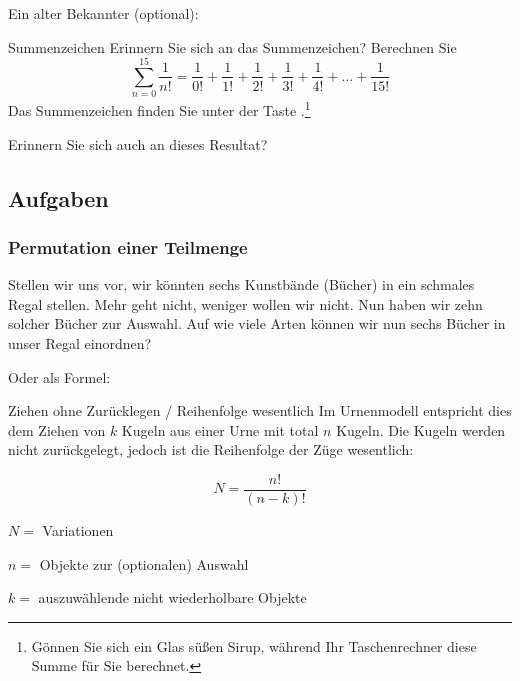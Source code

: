 Ein alter Bekannter (optional):

\vspace{3mm}

\begin{bemerkung}{Summenzeichen}{}
Erinnern Sie sich an das Summenzeichen? Berechnen
Sie $$\sum_{n=0}^{15}\frac{1}{n!} = \frac{1}{0!} + \frac{1}{1!}
+ \frac1{2!} + \frac1{3!} + \frac1{4!} + ... + \frac1{15!}$$ Das Summenzeichen finden Sie unter
der Taste .\footnote{Gönnen Sie sich
ein Glas süßen Sirup, während Ihr Taschenrechner diese Summe für Sie berechnet.}
\end{bemerkung}

Erinnern Sie sich auch an dieses Resultat? 



\subsection*{Aufgaben}
\newpage


\subsubsection{Permutation einer Teilmenge}
Stellen wir uns vor, wir könnten sechs Kunstbände (Bücher) in ein schmales
Regal stellen. Mehr geht nicht, weniger wollen wir nicht.
Nun haben wir zehn solcher Bücher zur Auswahl. Auf wie viele Arten können wir nun sechs Bücher in unser Regal einordnen?


Oder als Formel:
\begin{gesetz}{Ziehen ohne Zurücklegen / Reihenfolge wesentlich}{}
Im Urnenmodell entspricht dies dem Ziehen von $k$ Kugeln aus einer
Urne mit total $n$ Kugeln. Die Kugeln werden nicht zurückgelegt,
jedoch ist die Reihenfolge der Züge wesentlich:

$$N =\frac{n!}{(n-k)!}$$

$N = $ Variationen

$n = $ Objekte zur (optionalen) Auswahl

$k = $ auszuwählende nicht wiederholbare Objekte

\end{gesetz}

